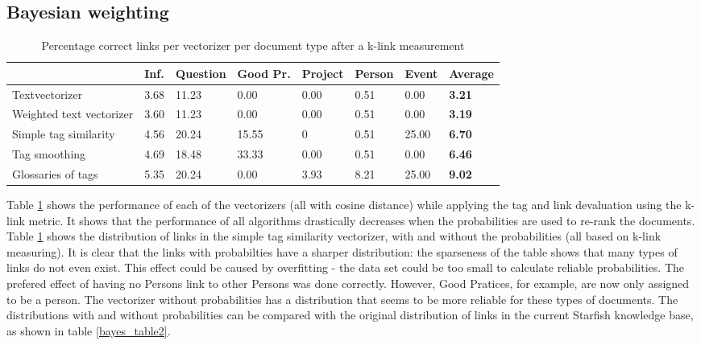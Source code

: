 \subsection{Bayesian weighting}
\begin{table}
\begin{tabular}{| l | l | l | l | l | l | l | l |}
\hline
 & Inf. &  Question &  Good Pr.& Project & Person &  Event & {\bf Average} \\
\hline
Textvectorizer & 3.68 & 11.23 & 0.00 & 0.00 & 0.51 & 0.00 & {\bf 3.21}\\
Weighted text vectorizer & 3.60 & 11.23 & 0.00 & 0.00 & 0.51 & 0.00 & {\bf 3.19} \\ 
Simple tag similarity & 4.56 & 20.24 & 15.55 & 0 & 0.51 & 25.00 & {\bf 6.70}\\
Tag smoothing & 4.69 & 18.48 & 33.33 & 0.00 & 0.51 & 0.00 & {\bf 6.46}\\
Glossaries of tags & 5.35 & 20.24 & 0.00 & 3.93 & 8.21 & 25.00 & {\bf 9.02}\\
\hline
\end{tabular}
\caption{Percentage correct links per vectorizer per document type after a k-link measurement}
\label{bayes_table1}
\end{table}

Table \ref{bayes_table1} shows the performance of each of the vectorizers (all with cosine distance) while applying the tag and link devaluation using the k-link metric. It shows that the performance of all algorithms drastically decreases when the probabilities are used to re-rank the documents. Table \ref{bayes_table1}  shows the distribution of links in the simple tag similarity vectorizer, with and without the probabilities (all based on k-link measuring). It is clear that the links with probabilties have a sharper distribution: the sparseness of the table shows that many types of links do not even exist. This effect could be caused by overfitting - the data set could be too small to calculate reliable probabilities. The prefered effect of having no Persons link to other Persons was done correctly. However, Good Pratices, for example, are now only assigned to be a person. The vectorizer without probabilities has a distribution that seems to be more reliable for these types of documents. The distributions with and without probabilities can be compared with the original distribution of links in the current Starfish knowledge base, as shown in table \ref{bayes_table2}.  

